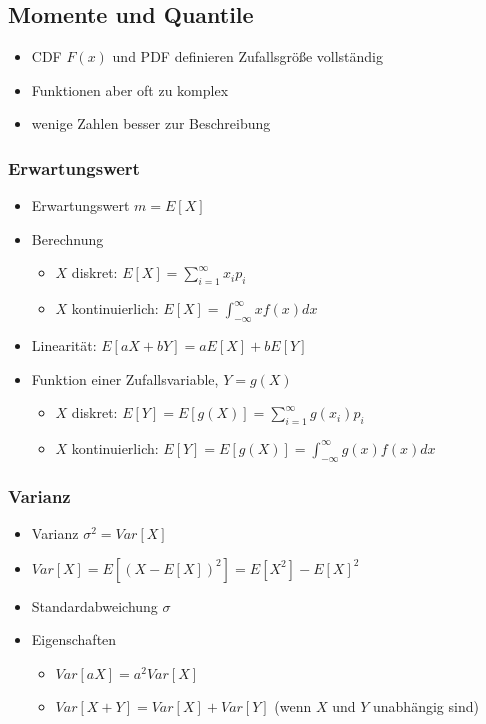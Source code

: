 \documentclass[nonacm=true, language=german]{acmart}
\begin{document}
\newpage

\subsection{Momente und Quantile}

\begin{itemize}
    \item \ac{CDF} $F(x)$ und \ac{PDF} definieren Zufallsgröße vollständig
    \item Funktionen aber oft zu komplex
    \item wenige Zahlen besser zur Beschreibung
\end{itemize}

\subsubsection{Erwartungswert}

\begin{itemize}
    \item Erwartungswert $m = E[X]$
    \item Berechnung
    \begin{itemize}
        \item $X$ diskret: $ \displaystyle E[X] = \sum_{i=1}^\infty x_i p_i $
        \item $X$ kontinuierlich: $ \displaystyle E[X] = \int_{-\infty}^\infty x f(x) dx $
    \end{itemize}
    \item Linearität: $ E[aX + bY] = a E[X] + b E[Y] $
    \item Funktion einer Zufallsvariable, $Y = g(X)$
    \begin{itemize}
        \item $X$ diskret: $ \displaystyle E[Y] = E[g(X)] = \sum_{i=1}^\infty g(x_i)p_i $
        \item $X$ kontinuierlich: $ \displaystyle E[Y] = E[g(X)] = \int_{-\infty}^\infty g(x)f(x) dx $
    \end{itemize}
\end{itemize}

\subsubsection{Varianz}

\begin{itemize}
    \item Varianz $\sigma^2 = Var[X]$
    \item $ Var[X] = E[(X - E[X])^2] = E[X^2] - E[X]^2 $
    \item Standardabweichung $\sigma$
    \item Eigenschaften
    \begin{itemize}
        \item $ Var[aX] = a^2 Var[X] $
        \item $ Var[X + Y] = Var[X] + Var[Y] $ (wenn $X$ und $Y$ unabhängig sind)
    \end{itemize}
\end{itemize}
\end{document}
